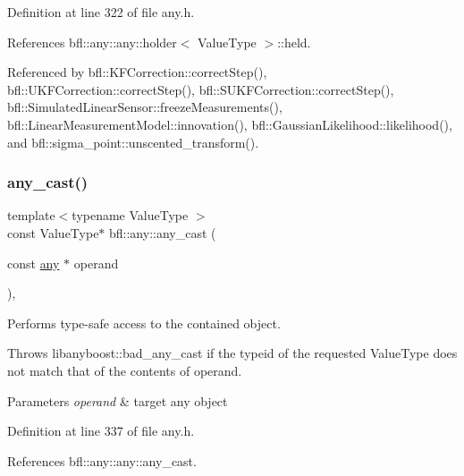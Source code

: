 Definition at line 322 of file any.\+h.



References bfl\+::any\+::any\+::holder$<$ Value\+Type $>$\+::held.



Referenced by bfl\+::\+K\+F\+Correction\+::correct\+Step(), bfl\+::\+U\+K\+F\+Correction\+::correct\+Step(), bfl\+::\+S\+U\+K\+F\+Correction\+::correct\+Step(), bfl\+::\+Simulated\+Linear\+Sensor\+::freeze\+Measurements(), bfl\+::\+Linear\+Measurement\+Model\+::innovation(), bfl\+::\+Gaussian\+Likelihood\+::likelihood(), and bfl\+::sigma\+\_\+point\+::unscented\+\_\+transform().

\mbox{\label{namespacebfl_1_1any_a16c163e06edb8565e3b47c4bf6136a52}} 
\subsubsection{\texorpdfstring{any\+\_\+cast()}{any\_cast()}\hspace{0.1cm}{\footnotesize\ttfamily [2/5]}}
{\footnotesize\ttfamily template$<$typename Value\+Type $>$ \\
const Value\+Type$\ast$ bfl\+::any\+::any\+\_\+cast (\begin{DoxyParamCaption}\item[{const \mbox{\hyperlink{classbfl_1_1any_1_1any}{any}} $\ast$}]{operand }\end{DoxyParamCaption})\hspace{0.3cm}{\ttfamily [inline]}, {\ttfamily [noexcept]}}



Performs type-\/safe access to the contained object. 

Throws libanyboost\+::bad\+\_\+any\+\_\+cast if the typeid of the requested Value\+Type does not match that of the contents of operand.


\begin{DoxyParams}{Parameters}
{\em operand} & target any object \\
\hline
\end{DoxyParams}


Definition at line 337 of file any.\+h.



References bfl\+::any\+::any\+::any\+\_\+cast.

\mbox{\label{namespacebfl_1_1any_a2b5d2dbb287832915598b087083885be}} 

